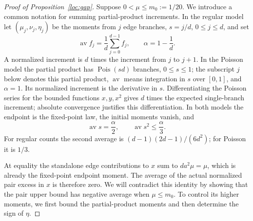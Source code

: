 \begin{proof}[Proof of Proposition~\ref{loc:gap}]
Suppose $0<\mu\le m_0:=1/20$.  We introduce a common notation for
summing partial-product increments.  In the regular model let
$(\mu_j,\nu_j,\eta_j)$ be the moments from $j$ edge branches,
$s=j/d$, $0\le j\le d$, and set
\[
 \operatorname{av} f_j=\frac1d\sum_{j=0}^{d-1}f_j,
 \qquad \alpha=1-\frac1d.
\]
A normalized increment is $d$ times the increment from $j$ to $j+1$.
In the Poisson model the partial product has $\operatorname{Pois}(sd)$
branches, $0\le s\le1$; the subscript $j$ below denotes this partial
product, $\operatorname{av}$ means integration in $s$ over $[0,1]$,
and $\alpha=1$.  Its normalized increment is the derivative in $s$.
Differentiating the Poisson series for the bounded functions
$x,y,x^2$ gives $d$ times the expected single-branch increment;
absolute convergence justifies this differentiation.  In both models
the endpoint is the fixed-point law, the initial moments vanish, and
\begin{equation}\label{loc:averages}
 \operatorname{av}s=\frac\alpha2,\qquad
 \operatorname{av}s^2\le\frac\alpha3.
\end{equation}
For regular counts the second average is
$(d-1)(2d-1)/(6d^2)$; for Poisson it is $1/3$.

At equality the standalone edge contributions to $x$ sum to
$da^2\mu=\mu$, which is already the fixed-point endpoint moment.
The average of the actual normalized pair excess in $x$ is therefore
zero.  We will contradict this identity by showing that the pair upper
bound has negative average when $\mu\le m_0$.  To control its higher
moments, we first bound the partial-product moments and then determine
the sign of $\eta$.


\end{proof}
